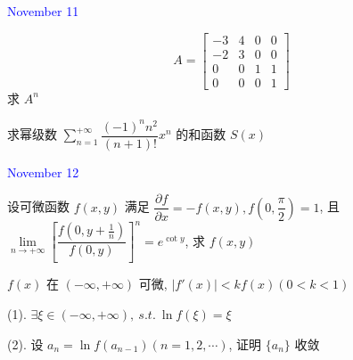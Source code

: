 \begin{solution}
	
\end{solution}


\textcolor{blue}{November 11}

\begin{example}[][Exam: 37.2.7]
	$$ A=
\begin{bmatrix}
	-3 & 4 & 0 & 0 \\
	-2 & 3 & 0 & 0 \\
	 0 & 0 & 1 & 1 \\
	 0 & 0 & 0 & 1
\end{bmatrix}$$
求 $A^{n}$
\end{example}

\begin{solution}
	
\end{solution}

\begin{example}[][Exam: 37.2.8]
	求幂级数 $\displaystyle{\sum\limits_{n=1}^{+\infty}\dfrac{(-1)^{n}n^{2}}{(n+1)!}x^{n}}$ 的和函数 $S(x)$
\end{example}

\begin{solution}
	
\end{solution}


\textcolor{blue}{November 12}

\begin{example}[][Exam: 37.2.9]
	设可微函数 $f(x,y)$ 满足 $\dfrac{\partial f}{\partial x}=-f(x,y), f(0,\dfrac{\pi}{2})=1$,
且 $\lim\limits_{n\to +\infty}\left[\dfrac{f(0,y+\frac{1}{n})}{f(0,y)} \right]^{n}=e^{\cot y} $, 求 $f(x,y)$
\end{example}

\begin{solution}
	
\end{solution}

\begin{example}[][Exam: 37.2.10]
	$f(x)$ 在 $(-\infty,+\infty)$ 可微, $\big|f'(x)\big| < kf(x)(0<k<1)$

(1). $\exists \xi\in(-\infty,+\infty),\ s.t.\ \ln f(\xi)=\xi$

(2). 设 $a_{n}=\ln f(a_{n-1})(n=1,2,\cdots)$, 证明 $\{a_{n}\}$ 收敛
\end{example}

\begin{solution}
	
\end{solution}


